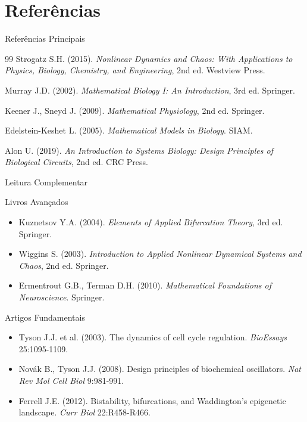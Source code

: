 \section{Referências}

\begin{frame}[allowframebreaks]{Referências Principais}
\begin{thebibliography}{99}
 Strogatz S.H. (2015). \textit{Nonlinear Dynamics and Chaos: With Applications to Physics, Biology, Chemistry, and Engineering}, 2nd ed. Westview Press.

 Murray J.D. (2002). \textit{Mathematical Biology I: An Introduction}, 3rd ed. Springer.

 Keener J., Sneyd J. (2009). \textit{Mathematical Physiology}, 2nd ed. Springer.

 Edelstein-Keshet L. (2005). \textit{Mathematical Models in Biology}. SIAM.

 Alon U. (2019). \textit{An Introduction to Systems Biology: Design Principles of Biological Circuits}, 2nd ed. CRC Press.
\end{thebibliography}
\end{frame}

\begin{frame}[allowframebreaks]{Leitura Complementar}
\begin{block}{Livros Avançados}
\begin{itemize}
    \item Kuznetsov Y.A. (2004). \textit{Elements of Applied Bifurcation Theory}, 3rd ed. Springer.
    \item Wiggins S. (2003). \textit{Introduction to Applied Nonlinear Dynamical Systems and Chaos}, 2nd ed. Springer.
    \item Ermentrout G.B., Terman D.H. (2010). \textit{Mathematical Foundations of Neuroscience}. Springer.
\end{itemize}
\end{block}

\begin{block}{Artigos Fundamentais}
\begin{itemize}
    \item Tyson J.J. et al. (2003). The dynamics of cell cycle regulation. \textit{BioEssays} 25:1095-1109.
    \item Novák B., Tyson J.J. (2008). Design principles of biochemical oscillators. \textit{Nat Rev Mol Cell Biol} 9:981-991.
    \item Ferrell J.E. (2012). Bistability, bifurcations, and Waddington's epigenetic landscape. \textit{Curr Biol} 22:R458-R466.
\end{itemize}
\end{block}
\end{frame}

